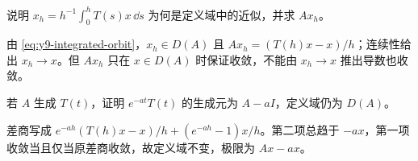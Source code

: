 \begin{exercise}[积分平滑]\label{ex:y9-time-average}
说明 $x_h=h^{-1}\int_0^hT(s)x\,\dd s$ 为何是定义域中的近似，并求 $Ax_h$。
\end{exercise}
\begin{solution}
由 \eqref{eq:y9-integrated-orbit}，$x_h\in D(A)$ 且 $Ax_h=(T(h)x-x)/h$；连续性给出 $x_h\to x$。但 $Ax_h$ 只在 $x\in D(A)$ 时保证收敛，不能由 $x_h\to x$ 推出导数也收敛。
\end{solution}

\begin{exercise}[生成元的平移]\label{ex:y9-generator-shift}
若 $A$ 生成 $T(t)$，证明 $e^{-at}T(t)$ 的生成元为 $A-aI$，定义域仍为 $D(A)$。
\end{exercise}
\begin{solution}
差商写成 $e^{-ah}(T(h)x-x)/h+(e^{-ah}-1)x/h$。第二项总趋于 $-ax$，第一项收敛当且仅当原差商收敛，故定义域不变，极限为 $Ax-ax$。
\end{solution}
